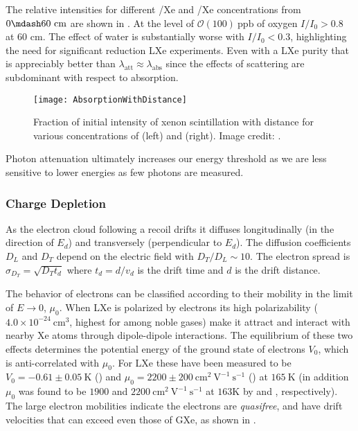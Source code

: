 The relative intensities for different /Xe and /Xe concentrations from $0 \mdash 60\ \mathrm{cm}$ are shown in
.  At the level of $\mathcal{O}(100)\ \mathrm{ppb}$ of
oxygen $I / I_0 > 0.8$ at 60 cm.  The effect of water is substantially worse with $I / I_0 < 0.3$, highlighting the need for
significant reduction LXe experiments.  Even with a LXe purity that is appreciably better than
 $\lambda_{\mathrm{att}} \approx \lambda_{\mathrm{abs}}$ since
the effects of scattering are subdominant with respect to absorption.

\begin{figure}
\centering
\texttt{[image: AbsorptionWithDistance]}
\caption{Fraction of initial intensity of xenon scintillation with distance for various concentrations of \htwoo (left) and \otwo
(right).  Image credit: .}
\label{fig:importance_procedure_effects_photons_absorption_distance}
\end{figure}

Photon attenuation ultimately increases our energy threshold as we are less sensitive to lower energies as few photons are
measured.



\subsubsection{Charge Depletion}
\label{subsubsec:importance_procedure_effects_charge}
As the electron cloud following a recoil drifts it diffuses
longitudinally (in the direction of $E_{d}$) and transversely (perpendicular to $E_{d}$).  The
diffusion coefficients $D_{L}$ and $D_{T}$ depend on the electric field with $D_{T}/D_{L} \sim 10$.  The electron spread is
$\sigma_{D_{T}} = \sqrt{D_{T} t_{d}}$ where $t_{d} = d/v_{d}$ is the drift time and $d$ is the drift distance.

The behavior of electrons can be classified according to their mobility in the limit of $E \rightarrow 0$, $\mu_0$.  When LXe is
polarized by electrons its high polarizability ($4.0 \times 10^{-24}\ \mathrm{cm^3}$, highest for among noble gases) make it
attract \electron and interact with nearby Xe atoms through dipole-dipole interactions.  The equilibrium of these two effects
determines the potential energy of the ground state of electrons $V_0$, which is anti-correlated with $\mu_0$.  For LXe these have
been measured to be $V_0 = -0.61 \pm 0.05\ \mathrm{K}$ () and $\mu_0 = 2200 \pm 200\ \mathrm{cm^2\ V^{-1}\ s^{-1}}$
() at $165\ \mathrm{K}$ (in addition $\mu_0$ was found to be $1900$ and $2200\ \mathrm{cm^2\ V^{-1}\ s^{-1}}$
at $163\mathrm{K}$ by  and , respectively).  The large electron mobilities indicate the
electrons are \textit{quasifree}, and have drift velocities that can exceed even those of GXe, as shown in
.

